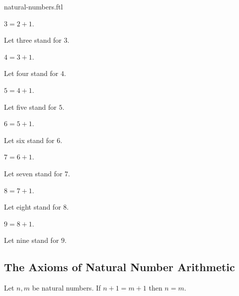 \documentclass{naproche-library}
\begin{document}
\begin{smodule}{natural-numbers.ftl}
  \begin{definition}[forthel,id=ARITHMETIC_01_3836725109456896,printid]
    $3 = 2 + 1$.

    Let three stand for $3$.
  \end{definition}

  \begin{definition}[forthel,id=ARITHMETIC_01_1709884968009728,printid]
    $4 = 3 + 1$.

    Let four stand for $4$.
  \end{definition}

  \begin{definition}[forthel,id=ARITHMETIC_01_6734726333202432,printid]
    $5 = 4 + 1$.

    Let five stand for $5$.
  \end{definition}

  \begin{definition}[forthel,id=ARITHMETIC_01_949139189792768,printid]
    $6 = 5 + 1$.

    Let six stand for $6$.
  \end{definition}

  \begin{definition}[forthel,id=ARITHMETIC_01_7245471749767168,printid]
    $7 = 6 + 1$.

    Let seven stand for $7$.
  \end{definition}

  \begin{definition}[forthel,id=ARITHMETIC_01_5658172888973312,printid]
    $8 = 7 + 1$.

    Let eight stand for $8$.
  \end{definition}

  \begin{definition}[forthel,id=ARITHMETIC_01_7371844250238976,printid]
    $9 = 8 + 1$.

    Let nine stand for $9$.
  \end{definition}


  \subsection*{The Axioms of Natural Number Arithmetic}

  \begin{axiom}[forthel,id=ARITHMETIC_01_3604163883696128,printid]
    Let $n, m$ be natural numbers.
    If $n + 1 = m + 1$ then $n = m$.
  \end{axiom}


\end{smodule}
\end{document}
